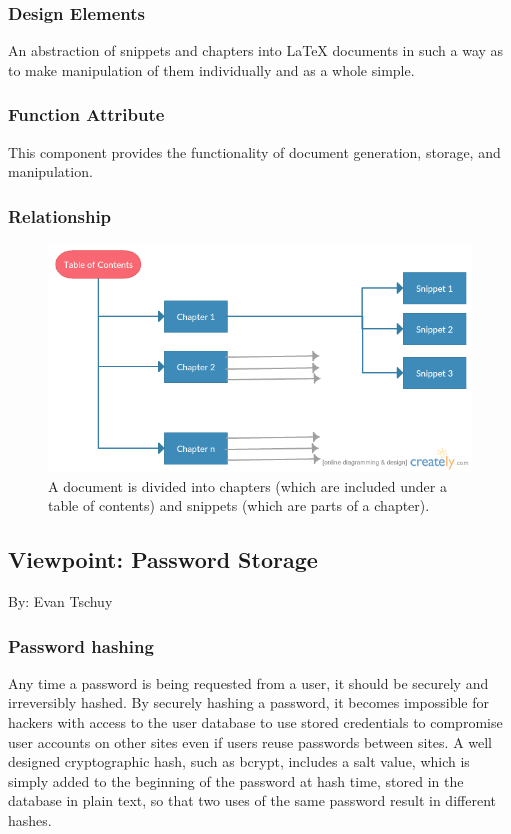 \documentclass[letterpaper, 10pt, draftclsnofoot, compsoc, onecolumn]{IEEEtran}
\begin{document}
\subsubsection{Design Elements}
An abstraction of snippets and chapters into LaTeX documents in such a way as to
make manipulation of them individually and as a whole simple.
{\noindent  \par}

\subsubsection{Function Attribute}
This component provides the functionality of document generation, storage, and
manipulation.
{\noindent  \par}

\subsubsection{Relationship}
\begin{figure}[ht!]
\centering
\includegraphics[scale=0.5]{formatting.png}
\caption{A document is divided into chapters (which are included under a table of contents) and snippets (which are parts of a chapter).}
\end{figure}
\pagebreak

\subsection{Viewpoint: Password Storage}
{\noindent By: Evan Tschuy \par}

\subsubsection{Password hashing}
Any time a password is being requested from a user, it should be securely and
irreversibly hashed. By securely hashing a password, it becomes impossible for
hackers with access to the user database to use stored credentials to compromise
user accounts on other sites even if users reuse passwords between sites. A well
designed cryptographic hash, such as bcrypt, includes a salt value, which is
simply added to the beginning of the password at hash time, stored in the
database in plain text, so that two uses of the same password result in
different hashes.
{\noindent  \par}
\end{document}

